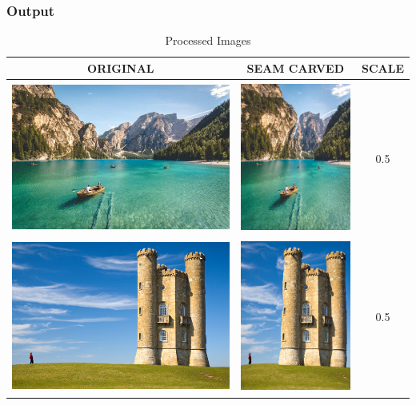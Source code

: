 \subsubsection{Output}


\begin{table}[!ht]
	\begin{center}
		\begin{tabular}{ | c | c | c | }
			\hline
			ORIGINAL & SEAM CARVED & SCALE \\ \hline
			\includegraphics[height=50mm]{question_5/Image-1.eps} & 
			\includegraphics[height=50mm]{question_5/Image-1_scaled_column_by_0.5.eps} & 
				0.5 \\ \hline
			\includegraphics[height=50mm]{question_5/Image-2.eps} & 
			\includegraphics[height=50mm]{question_5/Image-2_scaled_column_by_0.5.eps} & 
				0.5 \\ \hline
		\end{tabular}
	\end{center}
\caption{Processed Images}
\end{table}
